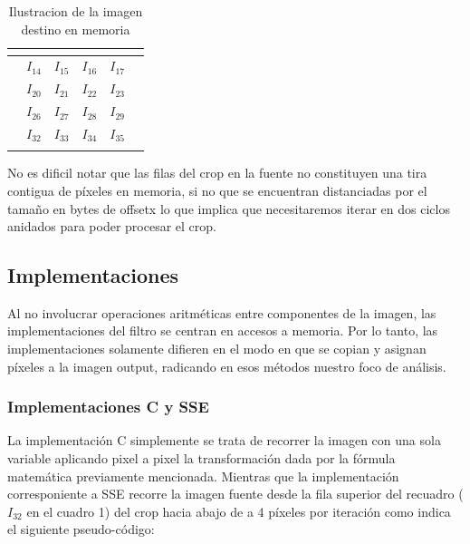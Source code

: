\begin{table}[h]
\centering
\mem
\begin{tabular}{l|c|c|c|c|l}
& \multicolumn{1}{l|}{}       & \multicolumn{1}{l|}{}   & \multicolumn{1}{l|}{}     & \multicolumn{1}{l|}{}      &  \\ \hline
 & \cellcolor[HTML]{FD6864}$I_{14}$ & \cellcolor[HTML]{FD6864}$I_{15}$ & \cellcolor[HTML]{FD6864}$I_{16}$  & \cellcolor[HTML]{FD6864}$I_{17}$ &  \\ \hline
 & \cellcolor[HTML]{FD6864}$I_{20}$ & \cellcolor[HTML]{FD6864}$I_{21}$ & \cellcolor[HTML]{FD6864}$I_{22}$  & \cellcolor[HTML]{FD6864}$I_{23}$ &  \\ \hline 
 & \cellcolor[HTML]{FD6864}$I_{26}$  & \cellcolor[HTML]{FD6864}$I_{27}$  & \cellcolor[HTML]{FD6864}$I_{28}$  & \cellcolor[HTML]{FD6864}$I_{29}$ &  \\ \hline
  & \cellcolor[HTML]{FD6864}$I_{32}$ & \cellcolor[HTML]{FD6864}$I_{33}$  & \cellcolor[HTML]{FD6864}$I_{34}$  & \cellcolor[HTML]{FD6864}$I_{35}$ &  \\ \hline
  & \multicolumn{1}{l|}{}       & \multicolumn{1}{l|}{}  & \multicolumn{1}{l|}{}      & \multicolumn{1}{l|}{}      &
\end{tabular}
\caption{Ilustracion de la imagen destino en memoria}
\end{table}




No es dificil notar que las filas del crop en la fuente no constituyen una tira contigua de píxeles en memoria, si no que se encuentran distanciadas por el tamaño en bytes de offsetx lo que implica que necesitaremos iterar en dos ciclos anidados para poder procesar el crop.

\subsection{Implementaciones}
Al no involucrar operaciones aritméticas entre componentes de la imagen, las implementaciones del filtro se centran en accesos a memoria. Por lo tanto, las implementaciones solamente difieren en el modo en que se copian y asignan píxeles a la imagen output, radicando en esos métodos nuestro foco de análisis. 
\subsubsection{Implementaciones C y SSE}
La implementación C simplemente se trata de recorrer la imagen con una sola variable aplicando pixel a pixel la transformación dada por la fórmula matemática previamente mencionada. Mientras que la implementación corresponiente a SSE recorre la imagen fuente desde la fila superior del recuadro ($I_{32}$ en el cuadro 1) del crop hacia abajo de a 4 píxeles por iteración como indica el siguiente pseudo-código: 


